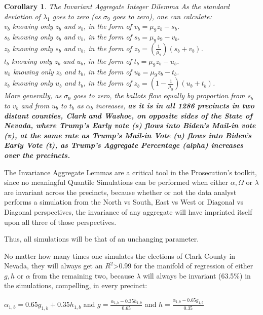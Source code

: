 \documentclass[preprint,13pt]{elsarticle}
\newtheorem{corollary}{Corollary}[theorem]
\begin{document}
\begin{corollary}{The Invariant Aggregate Integer Dilemma}
As the standard deviation of $\lambda_{1}$ goes to zero (as $\sigma_{9}$ goes to zero), one can calculate:\\
$v_{b}$ knowing only $z_{b}$ and $s_{b}$, in the form of $v_{b}=\mu_{9}z_{b}-s_{b}$.\\
$s_{b}$ knowing only $z_{b}$ and $v_{b}$, in the form of $s_{b}=\mu_{9}z_{9}-v_{b}$.\\
$z_{b}$ knowing only $s_{b}$ and $v_{b}$, in the form of $z_{b}=(\frac{1}{\mu_{9}})(s_{b}+v_{b})$.\\
$t_{b}$ knowing only $z_{b}$ and $u_{b}$, in the form of $t_{b}=\mu_{9}z_{b}-u_{b}$.\\
$u_{b}$ knowing only $z_{b}$ and $t_{b}$, in the form of $u_{b}=\mu_{9}z_{b}-t_{b}$.\\
$z_{b}$ knowing only $u_{b}$ and $t_{b}$, in the form of $z_{b}=(1-\frac{1}{\mu_{9}})(u_{b}+t_{b})$.\\
More generally, as  $\sigma_{9}$ goes to zero, the ballots flow equally by proportion from $s_{b}$ to $v_{b}$ and from $u_{b}$ to $t_{b}$ as $\alpha_{b}$ increases, \textbf{as it is in all 1286 precincts in two distant counties, Clark and Washoe, on opposite sides of the State of Nevada, where Trump's Early vote (s) flows into Biden's Mail-in vote (v), at the same rate as Trump's Mail-in Vote (u) flows into Biden's Early Vote (t), as Trump's Aggregate Percentage (alpha) increases over the precincts.}
\end{corollary}
\newpage
The Invariance Aggregate Lemmas are a critical tool in the Prosecution's toolkit, since no meaningful Quantile Simulations can be performed when either $\alpha, \Omega$ or $\lambda$  are invariant across the precincts, because whether or not the data analyst performs a simulation from the North vs South, East vs West or Diagonal vs Diagonal perspectives, the invariance of any aggregate will have imprinted itself upon all three of those perspectives.

Thus, all simulations will be that of an unchanging parameter. 

No matter how many times one simulates the elections of Clark County in Nevada, they will always get an $R^2$>0.99 for the manifold of regression of either $g,h$ or $\alpha$ from the remaining two, because $\lambda$ will always be invariant (63.5\%) in the simulations, compelling, in every precinct:

$\alpha_{1,b}=0.65g_{1,b}+0.35h_{1,b}$ and $g=\frac{\alpha_{1,b}-0.35h_{1,b}}{0.65}$ and $h=\frac{\alpha_{1,b}-0.65g_{1,b}}{0.35}$
\end{document}

